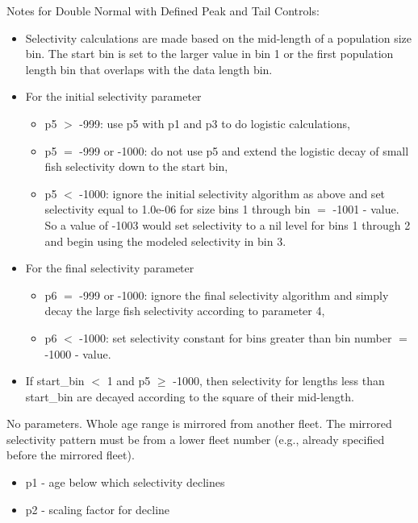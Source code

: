 Notes for Double Normal with Defined Peak and Tail Controls:
	\begin{itemize}
		\item Selectivity calculations are made based on the mid-length of a population size bin. The start bin is set to the larger value in bin 1 or the first population length bin that overlaps with the data length bin.
		\item For the initial selectivity parameter
		\begin{itemize}
			\item p5 $>$ -999: use p5 with p1 and p3 to do logistic calculations,
			\item p5 $=$ -999 or -1000: do not use p5 and extend the logistic decay of small fish selectivity down to the start bin,
			\item p5 $<$ -1000: ignore the initial selectivity algorithm as above and set selectivity equal to 1.0e-06 for size bins 1 through bin $=$ -1001 - value. So a value of -1003 would set selectivity to a nil level for bins 1 through 2 and begin using the modeled selectivity in bin 3.
		\end{itemize}
		\item For the final selectivity parameter
		\begin{itemize}
			\item p6 $=$ -999 or -1000: ignore the final selectivity algorithm and simply decay the large fish selectivity according to parameter 4,
			\item p6 $<$ -1000: set selectivity constant for bins greater than bin number $=$ -1000 - value.
		\end{itemize}
		\item If start\_bin $<$ 1 and p5 $\geq$ -1000, then selectivity for lengths less than start\_bin are decayed according to the square of their mid-length.
	\end{itemize}

\hypertarget{MirrorAnotherSelectivity}{}
No parameters. Whole age range is mirrored from another fleet. The mirrored selectivity pattern must be from a lower fleet number (e.g., already specified before the mirrored fleet).

\hypertarget{GaussianSelectivity}{}
	\begin{itemize}
		\item p1 - age below which selectivity declines
		\item p2 - scaling factor for decline
	\end{itemize}

